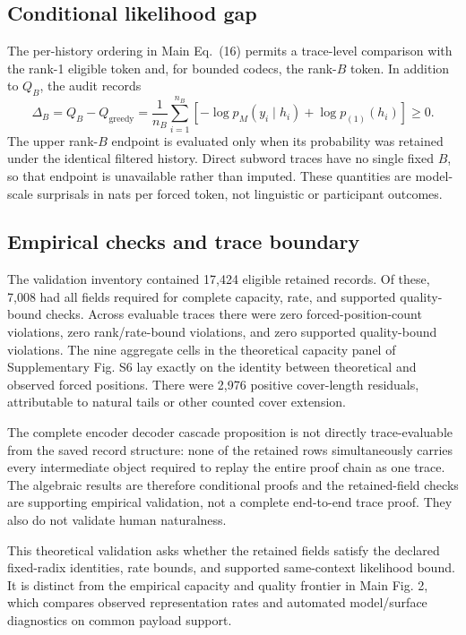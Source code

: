 \documentclass[fleqn,10pt]{wlscirep}
\begin{document}
\subsection*{Conditional likelihood gap}

The per-history ordering in Main Eq.~(16) permits a trace-level comparison with the rank-1 eligible token and, for bounded codecs, the rank-\(B\) token. In addition to \(Q_B\), the audit records
\[
\Delta_B
 = Q_B-Q_{\mathrm{greedy}}
 =\frac{1}{n_B}\sum_{i=1}^{n_B}
   \left[-\log p_M(y_i\mid h_i)+\log p_{(1)}(h_i)\right]\ge0 .
\]
The upper rank-\(B\) endpoint is evaluated only when its probability was retained under the identical filtered history. Direct subword traces have no single fixed \(B\), so that endpoint is unavailable rather than imputed. These quantities are model-scale surprisals in nats per forced token, not linguistic or participant outcomes.

\subsection*{Empirical checks and trace boundary}

The validation inventory contained 17,424 eligible retained records. Of these, 7,008 had all fields required for complete capacity, rate, and supported quality-bound checks. Across evaluable traces there were zero forced-position-count violations, zero rank/rate-bound violations, and zero supported quality-bound violations. The nine aggregate cells in the theoretical capacity panel of Supplementary Fig. S6 lay exactly on the identity between theoretical and observed forced positions. There were 2,976 positive cover-length residuals, attributable to natural tails or other counted cover extension.

The complete encoder decoder cascade proposition is not directly trace-evaluable from the saved record structure: none of the retained rows simultaneously carries every intermediate object required to replay the entire proof chain as one trace. The algebraic results are therefore conditional proofs and the retained-field checks are supporting empirical validation, not a complete end-to-end trace proof. They also do not validate human naturalness.

This theoretical validation asks whether the retained fields satisfy the declared fixed-radix identities, rate bounds, and supported same-context likelihood bound. It is distinct from the empirical capacity and quality frontier in Main Fig. 2, which compares observed representation rates and automated model/surface diagnostics on common payload support.
\end{document}
